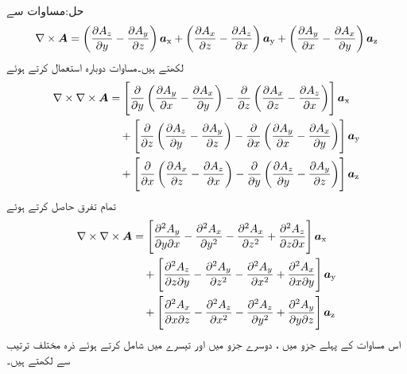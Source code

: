 حل:مساوات  سے 
\begin{align}
\nabla \times {\ensuremath{{\boldsymbol{A}}}}=\left(\frac{\partial A_z}{\partial y}-\frac{\partial A_y}{\partial z} \right){\boldsymbol{a}}_{\textup{x}}+\left( \frac{\partial A_x}{\partial z}-\frac{\partial A_z}{\partial x}\right){\boldsymbol{a}}_{\textup{y}}+\left(\frac{\partial A_y}{\partial x}-\frac{\partial A_x}{\partial y} \right){\boldsymbol{a}}_{\textup{z}}
\end{align}
لکھتے  ہیں۔مساوات  دوبارہ استعمال کرتے ہوئے 
\begin{align*}
\nabla \times \nabla \times {\ensuremath{{\boldsymbol{A}}}}&=\left[\frac{\partial}{\partial y}\left(\frac{\partial A_y}{\partial x}-\frac{\partial A_x}{\partial y} \right)-\frac{\partial}{\partial z}\left( \frac{\partial A_x}{\partial z}-\frac{\partial A_z}{\partial x}\right) \right]{\boldsymbol{a}}_{\textup{x}}\\
& \quad +\left[ \frac{\partial }{\partial z}\left(\frac{\partial A_z}{\partial y}-\frac{\partial A_y}{\partial z} \right)-\frac{\partial }{\partial x}\left(\frac{\partial A_y}{\partial x}-\frac{\partial A_x}{\partial y} \right)\right]{\boldsymbol{a}}_{\textup{y}}\\
&\quad +\left[\frac{\partial }{\partial x}\left( \frac{\partial A_x}{\partial z}-\frac{\partial A_z}{\partial x}\right)-\frac{\partial }{\partial y} \left(\frac{\partial A_z}{\partial y}-\frac{\partial A_y}{\partial z} \right)\right]{\boldsymbol{a}}_{\textup{z}}
\end{align*}
تمام تفرق حاصل کرتے ہوئے
\begin{align*}
\nabla \times \nabla \times {\ensuremath{{\boldsymbol{A}}}}&=\left[\frac{\partial^2 A_y}{\partial y\partial x}-\frac{\partial^2 A_x}{\partial y^2} -\frac{\partial^2 A_x}{\partial z^2}+\frac{\partial^2 A_z}{\partial z\partial x} \right]{\boldsymbol{a}}_{\textup{x}}\\
& \quad +\left[ \frac{\partial^2 A_z}{\partial z\partial y}-\frac{\partial^2 A_y}{\partial z^2}-\frac{\partial^2 A_y}{\partial x^2}+\frac{\partial^2 A_x}{\partial x\partial y} \right]{\boldsymbol{a}}_{\textup{y}}\\
&\quad +\left[ \frac{\partial^2 A_x}{\partial x\partial z}-\frac{\partial^2 A_z}{\partial x^2}- \frac{\partial^2 A_z}{\partial y^2}+\frac{\partial^2 A_y}{\partial y\partial z} \right]{\boldsymbol{a}}_{\textup{z}}
\end{align*}
اس مساوات کے پہلے جزو میں ، دوسرے جزو میں  اور تیسرے میں  شامل کرتے ہوئے ذرہ مختلف ترتیب سے لکھتے ہیں۔
